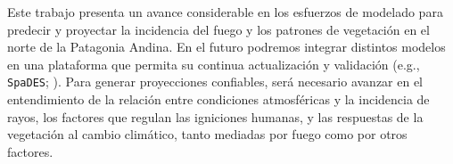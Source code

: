 


Este trabajo presenta un avance considerable en los esfuerzos de modelado para predecir y proyectar la incidencia del fuego y los patrones de vegetación en el norte de la Patagonia Andina. En el futuro podremos integrar distintos modelos en una plataforma que permita su continua actualización y validación (e.g., \texttt{SpaDES}; \citealt{barros2023empowering, SpaDES}). Para generar proyecciones confiables, será necesario avanzar en el entendimiento de la relación entre condiciones atmosféricas y la incidencia de rayos, los factores que regulan las igniciones humanas, y las respuestas de la vegetación al cambio climático, tanto mediadas por fuego como por otros factores. 